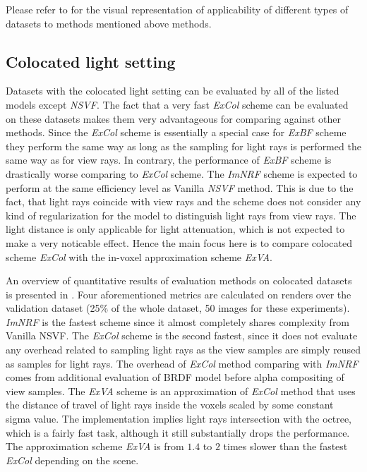 Please refer to  for the visual representation of applicability of different types of datasets to methods mentioned above methods.






\subsection{Colocated light setting}
\label{subsec:experiments_coloc}

Datasets with the colocated light setting can be evaluated by all of the listed models except \textit{NSVF}.
The fact that a very fast \textit{ExCol} scheme can be evaluated on these datasets
makes them very advantageous for comparing against other methods.
Since the \textit{ExCol} scheme is essentially a special case for \textit{ExBF} scheme
they perform the same way as long as the sampling for light rays is performed the same way as for view rays.
In contrary, the performance of \textit{ExBF} scheme is drastically worse comparing to \textit{ExCol} scheme.
The \textit{ImNRF} scheme is expected to perform at the same efficiency level as Vanilla \textit{NSVF} method.
This is due to the fact, that light rays coincide with view rays 
and the scheme does not consider any kind of regularization for the model
to distinguish light rays from view rays.
The light distance is only applicable for light attenuation, 
which is not expected to make a very noticable effect.
Hence the main focus here is to compare colocated scheme \textit{ExCol} with the in-voxel approximation scheme \textit{ExVA}.





An overview of quantitative results of evaluation methods on colocated datasets is presented in .
Four aforementioned metrics are calculated on renders over the validation dataset (25\% of the whole dataset, 50 images for these experiments).
\textit{ImNRF} is the fastest scheme since it almost completely shares complexity from Vanilla NSVF.
The \textit{ExCol} scheme is the second fastest,
since it does not evaluate any overhead related to sampling light rays
as the view samples are simply reused as samples for light rays.
The overhead of \textit{ExCol} method comparing with \textit{ImNRF} comes from additional evaluation of BRDF model before alpha compositing of view samples.
The \textit{ExVA} scheme is an approximation of \textit{ExCol} method
that uses the distance of travel of light rays inside the voxels scaled by some constant sigma value.
The implementation implies light rays intersection with the octree,
which is a fairly fast task, although it still substantially drops the performance.
The approximation scheme \textit{ExVA} is from $1.4$ to $2$ times slower
than the fastest \textit{ExCol} depending on the scene.



